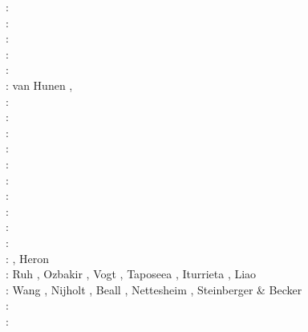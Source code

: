 \begin{scriptsize}
\twothousand: \cite{hanl00}\cite{labp00}\cite{lemm00}\cite{gumm00}\cite{lemo00}\cite{pepo00}\cite{scys00b}\\
\twothousandone: \cite{homo01}\cite{beoc01}\cite{kapo01}\\
\twothousandtwo: \cite{labu02}\cite{coli02}\cite{bast02}\cite{gedh02}\cite{kilg02}\\
\twothousandthree: \cite{wipo03}\cite{wabu03}\cite{geur03}\cite{upke03}\cite{vamf03}\cite{bupf03}\cite{lemm03}\cite{onmo03}\\
\twothousandfour: \cite{tibb04}\cite{gewi04}\cite{colm04}\cite{pybe04}\\
\twothousandfive: van Hunen \etal \cite{vazs05}, \cite{hagu05}\cite{wiwg05}\cite{mcjp05}\\
\twothousandsix: \cite{bube06}\cite{basv06}\cite{kasc06}\cite{fuwb06}\cite{colm06}\cite{pabs06}\cite{crnp06} \cite{sahm06}\\
\twothousandseven: \cite{afrf07}\cite{kore07}\cite{gewm07}\cite{jabn07}\\
\twothousandeight: \cite{affr08}\cite{tibb08}\cite{hapo08}\cite{busc08}\cite{clbz08}\cite{chlg08}
      \cite{kasb08}\cite{fabs08}\cite{chgu08}\cite{buit08}\cite{onlg08}\\
\twothousandnine: \cite{bupb09}\cite{plmg09}\cite{rigo09}\cite{bubg09}\cite{coco09}\\
\twothousandten: \cite{hamo10}\cite{fasm10}\cite{grpy10}\cite{vago10}\cite{plmf10}\cite{spgs10a}\cite{pygp10}
      \cite{jabw10}\\
\twothousandeleven: \cite{rera11}\cite{chss11}\\
\twothousandtwelve: \cite{wagw12}\cite{vacl12}\cite{buit12}\cite{kogp12}\cite{gohg12}\cite{trub12}\\
\twothousandthirteen: \cite{wazh13}\cite{krcu13}\cite{frbm13}\cite{wagw13}\cite{duyp13}\cite{rugb13} \cite{scdg13}\\
\twothousandfourteen: \cite{kava14}\cite{dusp14}\cite{wavp14}\cite{whbb14}\cite{scml14}
      \cite{mals14}\cite{gupm14}\cite{gahs14}\cite{mutg14}\\
\twothousandfifteen: \cite{wavp15}\cite{thkp15}\cite{mags15}\cite{duys15}\cite{dusp15}\\
\twothousandsixteen: \cite{wahz16}, Heron \etal \cite{heps16}\\
\twothousandseventeen: Ruh \etal \cite{rugb17}, Ozbakir \etal \cite{ozgw17},
                       Vogt \etal \cite{vomc17}, Taposeea \etal \cite{taac17}, 
                       Iturrieta \etal \cite{ithc17}, Liao \etal \cite{liwg17}\\
\twothousandeighteen: Wang \etal \cite{wavp18}, Nijholt \etal \cite{nigw18}, 
                      Beall \etal \cite{bemc18}, Nettesheim \etal \cite{neew18}, 
                      Steinberger \& Becker \cite{stbe18}\\
\twothousandnineteen: \cite{koen19}\cite{kipd19}\cite{crcm19}\cite{pedm19}\cite{mazz19}\cite{chch19}\\
\twothousandtwenty: \cite{yamq20}
\end{scriptsize}



